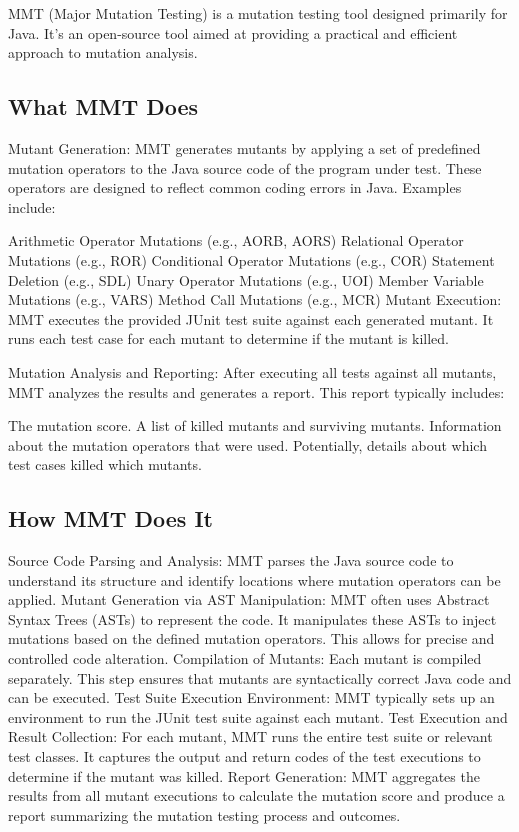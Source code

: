 \documentclass[sigplan, nonacm]{acmart}
\begin{document}
MMT (Major Mutation Testing) is a mutation testing tool designed primarily for Java. It's an open-source tool aimed at providing a practical and efficient approach to mutation analysis.

\subsection{What MMT Does}

Mutant Generation: MMT generates mutants by applying a set of predefined mutation operators to the Java source code of the program under test. These operators are designed to reflect common coding errors in Java. Examples include:

Arithmetic Operator Mutations (e.g., AORB, AORS)
Relational Operator Mutations (e.g., ROR)
Conditional Operator Mutations (e.g., COR)
Statement Deletion (e.g., SDL)
Unary Operator Mutations (e.g., UOI)
Member Variable Mutations (e.g., VARS)
Method Call Mutations (e.g., MCR)
Mutant Execution: MMT executes the provided JUnit test suite against each generated mutant. It runs each test case for each mutant to determine if the mutant is killed.

Mutation Analysis and Reporting: After executing all tests against all mutants, MMT analyzes the results and generates a report. This report typically includes:

The mutation score.
A list of killed mutants and surviving mutants.
Information about the mutation operators that were used.
Potentially, details about which test cases killed which mutants.
\subsection{How MMT Does It}

Source Code Parsing and Analysis: MMT parses the Java source code to understand its structure and identify locations where mutation operators can be applied.
Mutant Generation via AST Manipulation: MMT often uses Abstract Syntax Trees (ASTs) to represent the code. It manipulates these ASTs to inject mutations based on the defined mutation operators. This allows for precise and controlled code alteration.
Compilation of Mutants: Each mutant is compiled separately. This step ensures that mutants are syntactically correct Java code and can be executed.
Test Suite Execution Environment: MMT typically sets up an environment to run the JUnit test suite against each mutant.
Test Execution and Result Collection: For each mutant, MMT runs the entire test suite or relevant test classes. It captures the output and return codes of the test executions to determine if the mutant was killed.
Report Generation: MMT aggregates the results from all mutant executions to calculate the mutation score and produce a report summarizing the mutation testing process and outcomes.
\end{document}
